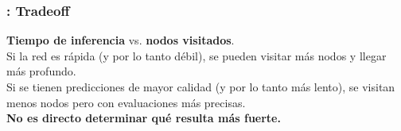 \begin{frame}
\frametitle{: Tradeoff}
\textbf{Tiempo de inferencia} vs. \textbf{nodos visitados}. \\
\vspace{1em}
\pause
Si la red es rápida (y por lo tanto débil), se pueden visitar más nodos y llegar más profundo. \\
\pause
Si se tienen predicciones de mayor calidad (y por lo tanto más lento), se visitan menos nodos pero con evaluaciones más precisas. \\
\pause
\vspace{1em}
\textbf{No es directo determinar qué resulta más fuerte.}
\end{frame}
